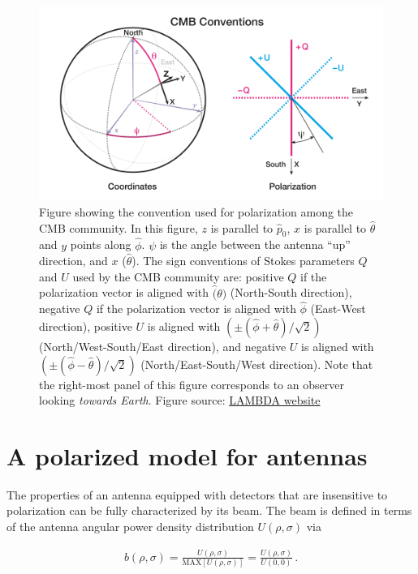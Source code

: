 \documentclass[a4paper,11pt]{article}
\begin{document}
\begin{figure}
	\centering
	\includegraphics[width=0.7\linewidth]{figures/cmb_coord_convention}
	\caption{Figure showing the convention used for polarization among the CMB community. In this figure, $z$ is parallel to $\hat{p}_0$, $x$ is parallel to $\hat{\theta}$ and $y$ points along $\hat{\phi}$. $\psi$ is the angle between the antenna ``up'' direction, and $x$ ($\hat{\theta}$). The sign conventions of Stokes parameters $Q$ and $U$ used by the CMB community are: positive $Q$ if the polarization vector is aligned with $\hat(\theta)$ (North-South direction), negative $Q$ if the polarization vector is aligned with $\hat{\phi}$ (East-West direction), positive $U$ is aligned with $(\pm(\hat{\phi} + \hat{\theta})/\sqrt{2} )$ (North/West-South/East direction), and negative $U$ is aligned with $(\pm(\hat{\phi} - \hat{\theta})/\sqrt{2} )$ (North/East-South/West direction). Note that the right-most panel of this figure corresponds to an observer looking \textsl{towards Earth}. Figure source: \href{https://lambda.gsfc.nasa.gov/product/about/pol_convention.cfm}{LAMBDA website}}
	\label{fig::cmbcoordconvention}
\end{figure}

\section{A polarized model for antennas}
\label{sec::antennas}

The properties of an antenna equipped with detectors that are insensitive to polarization can be fully characterized by its beam. The beam is defined in terms of the antenna angular power density distribution $U(\rho,\sigma)$ via

\begin{equation}
\begin{aligned}
b(\rho, \sigma) = \frac{ U(\rho, \sigma) }{ \mathrm{MAX}\left[ U(\rho,\sigma) \right] }  =  \frac{ U(\rho, \sigma) }{ U(0,0) } \, .
\end{aligned}
\label{eq::beam_def}
\end{equation}
\end{document}
